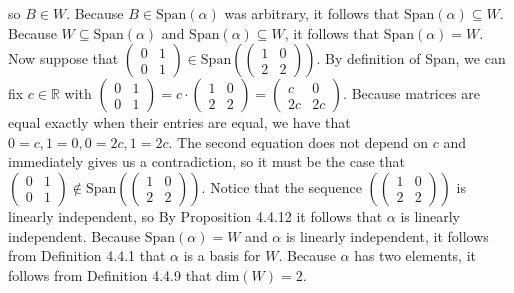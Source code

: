 \documentclass[12pt]{article}
\newenvironment{problem}[2][Problem]
{
	\begin{trivlist} 
		\item[\hskip \labelsep {\bfseries #1 #2:}]
	}
{
	\end{trivlist}
	}
\newenvironment{solution}[1][Solution]
{
	\begin{trivlist} 
		\item[\hskip \labelsep {\itshape #1:}]
	}
	{
	\end{trivlist}
}
\begin{document}
\begin{problem}{2}
\begin{solution}
so $B \in W$. Because $B \in \text{Span}(\alpha)$ was arbitrary, it follows that $\text{Span}(\alpha) \subseteq W$. Because $W \subseteq \text{Span}(\alpha)$ and $\text{Span}(\alpha) \subseteq W$, it follows that $\text{Span}(\alpha) = W$. Now suppose that $\begin{pmatrix} 0&1\\0&1 \end{pmatrix} \in \text{Span}\left( \begin{pmatrix} 1&0\\2&2 \end{pmatrix} \right)$. By definition of Span, we can fix $c \in \mathbb{R}$ with $\begin{pmatrix} 0&1\\0&1 \end{pmatrix}= c\cdot \begin{pmatrix} 1&0\\2&2 \end{pmatrix} = \begin{pmatrix} c&0\\2c&2c \end{pmatrix}$. Because matrices are equal exactly when their entries are equal, we have that $0=c, 1=0,0=2c,1=2c$. The second equation does not depend on $c$ and immediately gives us a contradiction, so it must be the case that $\begin{pmatrix} 0&1\\0&1 \end{pmatrix} \notin \text{Span}\left( \begin{pmatrix} 1&0\\2&2 \end{pmatrix} \right)$. Notice that the sequence $\left( \begin{pmatrix} 1&0\\2&2 \end{pmatrix} \right)$ is linearly independent, so By Proposition 4.4.12 it follows that $\alpha$ is linearly independent. Because $\text{Span}(\alpha) = W$ and $\alpha$ is linearly independent, it follows from Definition 4.4.1 that $\alpha$ is a basis for $W$. Because $\alpha$ has two elements, it follows from Definition 4.4.9 that dim$(W)=2$.
\end{solution}
\end{problem}
\end{document}
